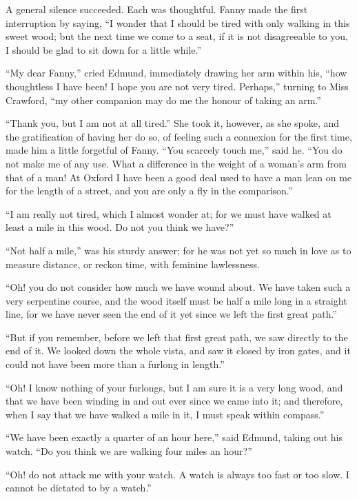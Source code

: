 \documentclass{article}
\begin{document}
A general silence succeeded.  Each was thoughtful.
Fanny made the first interruption by saying, ``I wonder
that I should be tired with only walking in this sweet wood;
but the next time we come to a seat, if it is not disagreeable
to you, I should be glad to sit down for a little while.''

``My dear Fanny,'' cried Edmund, immediately drawing her arm
within his, ``how thoughtless I have been!  I hope you
are not very tired.  Perhaps,'' turning to Miss Crawford,
``my other companion may do me the honour of taking an arm.''

``Thank you, but I am not at all tired.''  She took it,
however, as she spoke, and the gratification of having
her do so, of feeling such a connexion for the first time,
made him a little forgetful of Fanny.  ``You scarcely
touch me,'' said he.  ``You do not make me of any use.
What a difference in the weight of a woman's arm from
that of a man!  At Oxford I have been a good deal used
to have a man lean on me for the length of a street,
and you are only a fly in the comparison.''

``I am really not tired, which I almost wonder at;
for we must have walked at least a mile in this wood.
Do not you think we have?''

``Not half a mile,'' was his sturdy answer; for he was not yet
so much in love as to measure distance, or reckon time,
with feminine lawlessness.

``Oh! you do not consider how much we have wound about.
We have taken such a very serpentine course, and the wood
itself must be half a mile long in a straight line,
for we have never seen the end of it yet since we left
the first great path.''

``But if you remember, before we left that first great path,
we saw directly to the end of it.  We looked down the
whole vista, and saw it closed by iron gates, and it
could not have been more than a furlong in length.''

``Oh!  I know nothing of your furlongs, but I am sure
it is a very long wood, and that we have been winding
in and out ever since we came into it; and therefore,
when I say that we have walked a mile in it, I must speak
within compass.''

``We have been exactly a quarter of an hour here,''
said Edmund, taking out his watch.  ``Do you think we
are walking four miles an hour?''

``Oh! do not attack me with your watch.  A watch is always
too fast or too slow.  I cannot be dictated to by a watch.''
\end{document}
